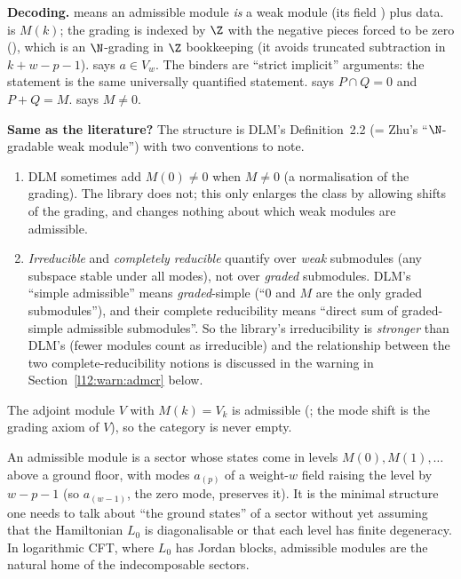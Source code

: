 \begin{dictionary}
\textbf{Decoding.}  means an admissible module \emph{is} a weak module
(its field ) plus data.  is $M(k)$; the grading is indexed by $\Z$ with
the negative pieces forced to be zero (), which is an $\N$-grading in $\Z$
bookkeeping (it avoids truncated subtraction in $k+w-p-1$).  says $a\in V_w$.
The binders  are ``strict implicit'' arguments: the statement is the same universally
quantified statement.  says $P\cap Q = 0$ and $P+Q = M$. 
says $M\neq0$.

\textbf{Same as the literature?} The structure is DLM's Definition~2.2 (= Zhu's ``$\N$-gradable weak
module'') with two conventions to note.
\begin{enumerate}
\item DLM sometimes add $M(0)\neq0$ when $M\neq0$ (a normalisation of the grading). The library does
  not; this only enlarges the class by allowing shifts of the grading, and changes nothing about which
  weak modules are admissible.
\item \emph{Irreducible} and \emph{completely reducible} quantify over \emph{weak} submodules (any
  subspace stable under all modes), not over \emph{graded} submodules. DLM's ``simple admissible''
  means \emph{graded}-simple (``$0$ and $M$ are the only graded submodules''), and their complete
  reducibility means ``direct sum of graded-simple admissible submodules''. So the library's
  irreducibility is \emph{stronger} than DLM's (fewer modules count as irreducible) and the
  relationship between the two complete-reducibility notions is discussed in
  the warning in Section~\ref{l12:warn:admcr} below.
\end{enumerate}
The adjoint module $V$ with $M(k) = V_k$ is admissible (; the mode shift
is the grading axiom of $V$), so the category is never empty.
\end{dictionary}

\begin{physics}
An admissible module is a sector whose states come in levels $M(0),M(1),\dots$ above a ground floor, with modes
$a_{(p)}$ of a weight-$w$ field raising the level by $w-p-1$ (so $a_{(w-1)}$, the zero mode, preserves it). It
is the minimal structure one needs to talk about ``the ground states'' of a sector without yet assuming that
the Hamiltonian $L_0$ is diagonalisable or that each level has finite degeneracy. In logarithmic CFT, where
$L_0$ has Jordan blocks, admissible modules are the natural home of the indecomposable sectors.
\end{physics}

